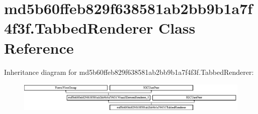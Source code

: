 \hypertarget{classmd5b60ffeb829f638581ab2bb9b1a7f4f3f_1_1TabbedRenderer}{}\section{md5b60ffeb829f638581ab2bb9b1a7f4f3f.\+Tabbed\+Renderer Class Reference}
\label{classmd5b60ffeb829f638581ab2bb9b1a7f4f3f_1_1TabbedRenderer}
Inheritance diagram for md5b60ffeb829f638581ab2bb9b1a7f4f3f.\+Tabbed\+Renderer\+:\begin{figure}[H]
\begin{center}
\leavevmode
\includegraphics[height=1.403509cm]{classmd5b60ffeb829f638581ab2bb9b1a7f4f3f_1_1TabbedRenderer}
\end{center}
\end{figure}
